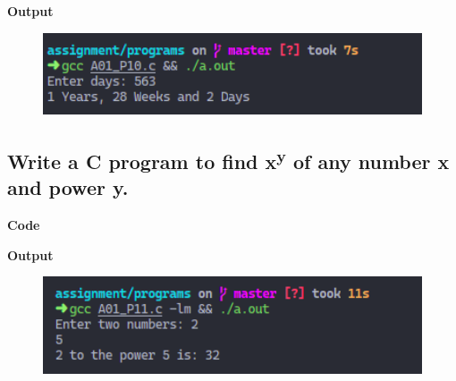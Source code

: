 \documentclass[a4paper]{article}
\begin{document}


\textbf{Output}

\begin{figure}[h]
  \includegraphics[width=12cm]{A01_P10}
\end{figure}

\newpage



\subsection{Write a C program to find x\textsuperscript{y} of any number x and power y.}
\textbf{Code}



\textbf{Output}

\begin{figure}[h]
  \includegraphics[width=12cm]{A01_P11}
\end{figure}

\newpage

\end{document}

